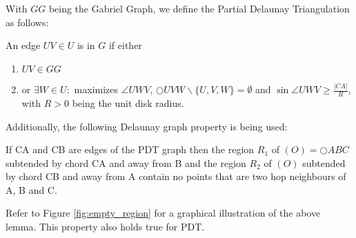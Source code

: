 With $GG $ being the Gabriel Graph, we define the Partial Delaunay Triangulation as follows:
\begin{definition}
\label{pdt-def}
An edge $UV \in U $ is in $G $ if either 
\begin{enumerate}
\renewcommand{\labelenumi}{(\roman{enumi})}
 \item $UV \in GG $
 \item or $\exists{W} \in U : $ maximizes $\angle{UWV} $, $\bigcirc{UVW}  \backslash \{U, V, W\} = \emptyset $ and $\sin{\angle{UWV}} \geq\frac{|CA|}{R} $, with $R>0 $ being the unit disk radius.
\end{enumerate} 
\end{definition}


Additionally, the following Delaunay graph property is being used:
\begin{lemma}
\label{emptyregion}
If CA and CB are edges of the PDT graph then the region $R_1 $ of $(O)=\bigcirc{ABC} $ subtended by chord CA and away from B and the region $R_2 $ of $(O) $ subtended by chord CB and away from A contain no points that are two hop neighbours of A, B and C.
\end{lemma}


Refer to Figure \ref{fig:empty_region} for a graphical illustration of the above lemma.
This property also holds true for PDT.


